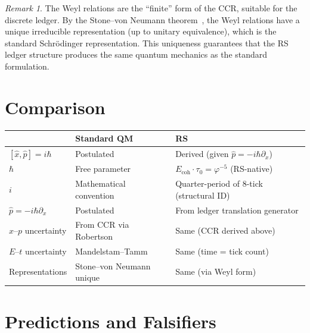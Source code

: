 \documentclass[12pt,a4paper]{article}
\theoremstyle{definition}
\theoremstyle{remark}
\newtheorem{remark}[theorem]{Remark}
\begin{document}
\begin{remark}
The Weyl relations are the ``finite'' form of the CCR, suitable
for the discrete ledger.  By the Stone--von Neumann
theorem~\cite{vNeumann1931}, the Weyl relations have a unique
irreducible representation (up to unitary equivalence), which is
the standard Schr\"odinger representation.  This uniqueness
guarantees that the RS ledger structure produces the same quantum
mechanics as the standard formulation.
\end{remark}

\section{Comparison}
\label{sec:comparison}

\begin{center}
\renewcommand{\arraystretch}{1.3}
\begin{tabular}{@{}lll@{}}
\toprule
& \textbf{Standard QM} & \textbf{RS} \\
\midrule
$[\hat{x},\hat{p}] = i\hbar$ & Postulated & Derived (given $\hat{p} = -i\hbar\partial_x$) \\
$\hbar$ & Free parameter & $E_\mathrm{coh}\cdot\tau_0 = \varphi^{-5}$ (RS-native) \\
$i$ & Mathematical convention & Quarter-period of 8-tick (structural ID) \\
$\hat{p} = -i\hbar\partial_x$ & Postulated & From ledger translation generator \\
$x$--$p$ uncertainty & From CCR via Robertson & Same (CCR derived above) \\
$E$--$t$ uncertainty & Mandelstam--Tamm & Same (time = tick count) \\
Representations & Stone--von Neumann unique & Same (via Weyl form) \\
\bottomrule
\end{tabular}
\end{center}

\section{Predictions and Falsifiers}
\label{sec:predictions}
\end{document}
